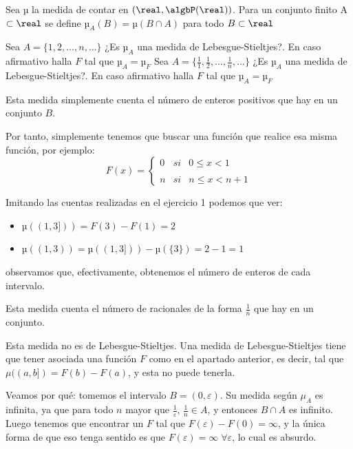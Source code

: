 \begin{problem}
Sea µ la medida de contar en $(\real, \algbP(\real))$. Para un conjunto finito A $\subset \real$ se define $µ_A(B) = µ(B \cap A)$ para todo $B \subset \real$

\ppart Sea $A=\{1,2,...,n,...\}$ ¿Es $µ_A$ una medida de Lebesgue-Stieltjes?. En caso afirmativo halla $F$ tal que $µ_A=µ_F$
\ppart Sea $A=\{\frac{1}{1},\frac{1}{2},...,\frac{1}{n},...\}$ ¿Es $µ_A$ una medida de Lebesgue-Stieltjes?. En caso afirmativo halla $F$ tal que $µ_A=µ_F$
\solution


\spart Esta medida simplemente cuenta el número de enteros positivos que hay en un conjunto $B$.

Por tanto, simplemente tenemos que buscar una función que realice esa misma función, por ejemplo:
\[F(x)=\left\{ \begin{array}{lcc}
             0 &   si  & 0 \leq x < 1 \\
             \\ n &  si  & n \leq x < n+1
             \end{array}
   \right.\]

Imitando las cuentas realizadas en el ejercicio 1 podemos que ver:
\begin{itemize}
\item $µ((1,3])) = F(3) - F(1) = 2$
\item $µ((1,3)) = µ((1,3])) - µ(\{3\}) = 2 - 1 = 1$
\end{itemize}
observamos que, efectivamente, obtenemos el número de enteros de cada intervalo.

\spart Esta medida cuenta el número de racionales de la forma $\frac{1}{n}$ que hay en un conjunto.

Esta medida no es de Lebesgue-Stieltjes. Una medida de Lebesgue-Stieltjes tiene que tener asociada una función $F$ como en el apartado anterior, es decir, tal que $μ((a,b]) = F(b) - F(a)$, y esta no puede tenerla.

Veamos por qué: tomemos el intervalo $B = (0,ε)$. Su medida según $μ_A$ es infinita, ya que para todo $n$ mayor que $\frac{1}{ε}$, $\frac{1}{n} ∈ A$, y entonces $B∩A$ es infinito. Luego tenemos que encontrar un $F$ tal que $F(ε) - F(0) = ∞$, y la única forma de que eso tenga sentido es que $F(ε) = ∞\; ∀ε$, lo cual es absurdo.

\end{problem}

